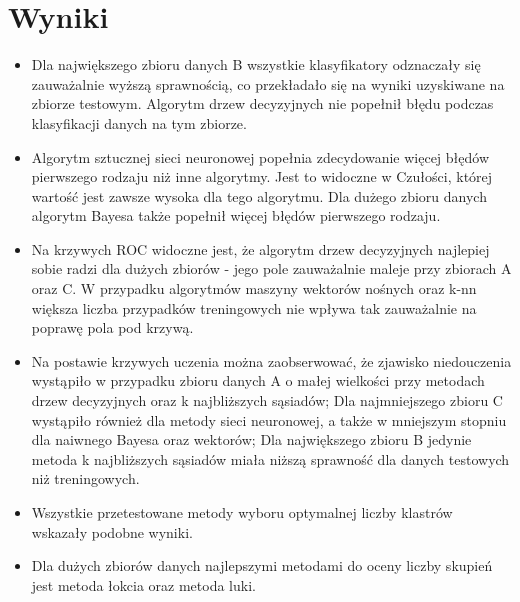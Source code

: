 \documentclass[a4paper,11pt]{article}
\begin{document}

\newpage
\section{Wyniki}

\begin{itemize}
    \item Dla największego zbioru danych B wszystkie klasyfikatory odznaczały się zauważalnie wyższą sprawnością, co przekładało się  na wyniki uzyskiwane na zbiorze testowym. Algorytm drzew decyzyjnych nie popełnił błędu podczas klasyfikacji danych na tym zbiorze.
    \item Algorytm sztucznej sieci neuronowej popełnia zdecydowanie więcej błędów pierwszego rodzaju niż inne algorytmy. Jest to widoczne w Czułości, której wartość jest zawsze wysoka dla tego algorytmu. Dla dużego zbioru danych algorytm Bayesa także popełnił więcej błędów pierwszego rodzaju.
    \item Na krzywych ROC widoczne jest, że algorytm drzew decyzyjnych najlepiej sobie radzi dla dużych zbiorów - jego pole zauważalnie maleje przy zbiorach A oraz C. W przypadku algorytmów maszyny wektorów nośnych oraz k-nn większa liczba przypadków treningowych nie wpływa tak zauważalnie na poprawę pola pod krzywą. 
    \item Na postawie krzywych uczenia można zaobserwować, że zjawisko niedouczenia wystąpiło w przypadku zbioru danych A o małej wielkości przy metodach drzew decyzyjnych oraz k najbliższych sąsiadów; Dla najmniejszego zbioru C wystąpiło również dla metody sieci neuronowej, a także w mniejszym stopniu dla naiwnego Bayesa oraz wektorów; Dla największego zbioru B jedynie metoda k najbliższych sąsiadów miała niższą sprawność dla danych testowych niż treningowych.
    \item Wszystkie przetestowane metody wyboru optymalnej liczby klastrów wskazały podobne wyniki.
    \item Dla dużych zbiorów danych najlepszymi metodami do oceny liczby skupień jest metoda łokcia oraz metoda luki.
\end{itemize}



    
\end{document}
